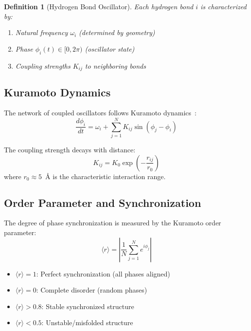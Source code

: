 \documentclass[twocolumn,aps,prx,superscriptaddress,longbibliography]{revtex4-2}
\newtheorem{definition}[theorem]{Definition}
\theoremstyle{remark}
\newcommand{\orderpar}{\langle r \rangle}
\begin{document}
\begin{definition}[Hydrogen Bond Oscillator]
\label{def:oscillator}
Each hydrogen bond $i$ is characterized by:
\begin{enumerate}
    \item Natural frequency $\omega_i$ (determined by geometry)
    \item Phase $\phi_i(t) \in [0, 2\pi)$ (oscillator state)
    \item Coupling strengths $K_{ij}$ to neighboring bonds
\end{enumerate}
\end{definition}

\subsection{Kuramoto Dynamics}

The network of coupled oscillators follows Kuramoto dynamics~\cite{Kuramoto1984,Strogatz2000}:
\begin{equation}
\frac{d\phi_i}{dt} = \omega_i + \sum_{j=1}^{N} K_{ij} \sin(\phi_j - \phi_i)
\label{eq:kuramoto}
\end{equation}

The coupling strength decays with distance:
\begin{equation}
K_{ij} = K_0 \exp\left(-\frac{r_{ij}}{r_0}\right)
\label{eq:coupling}
\end{equation}
where $r_0 \approx 5$~\AA{} is the characteristic interaction range.

\subsection{Order Parameter and Synchronization}

The degree of phase synchronization is measured by the Kuramoto order
parameter:
\begin{equation}
\orderpar = \left| \frac{1}{N} \sum_{j=1}^{N} e^{i\phi_j} \right|
\label{eq:order}
\end{equation}

\begin{itemize}
    \item $\orderpar = 1$: Perfect synchronization (all phases aligned)
    \item $\orderpar = 0$: Complete disorder (random phases)
    \item $\orderpar > 0.8$: Stable synchronized structure
    \item $\orderpar < 0.5$: Unstable/misfolded structure
\end{itemize}
\end{document}
